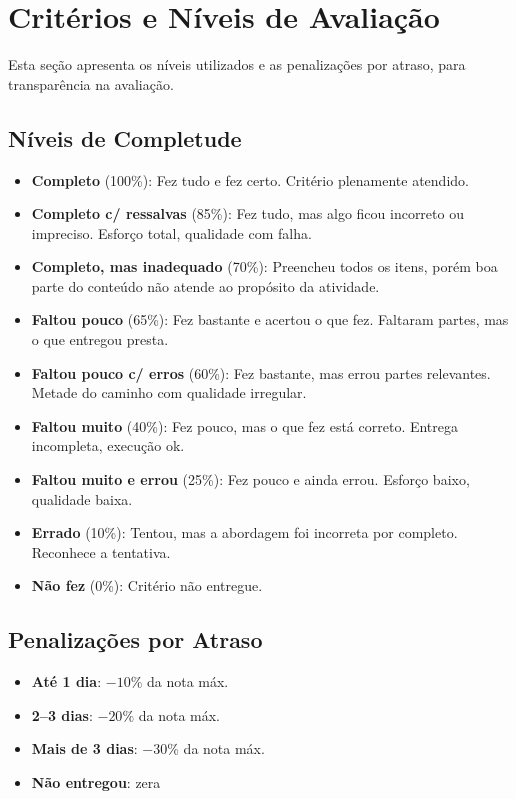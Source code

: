\documentclass[
  sigconf,
  language=portuguese
]{acmart}
\begin{document}
\section{Critérios e Níveis de Avaliação}

Esta seção apresenta os níveis utilizados e as penalizações por atraso, para transparência na avaliação.

\subsection{Níveis de Completude}

\begin{itemize}[leftmargin=14pt,itemsep=2pt,topsep=3pt]
  \item \textbf{Completo} (100\%): Fez tudo e fez certo. Critério plenamente atendido.
  \item \textbf{Completo c/ ressalvas} (85\%): Fez tudo, mas algo ficou incorreto ou impreciso. Esforço total, qualidade com falha.
  \item \textbf{Completo, mas inadequado} (70\%): Preencheu todos os itens, porém boa parte do conteúdo não atende ao propósito da atividade.
  \item \textbf{Faltou pouco} (65\%): Fez bastante e acertou o que fez. Faltaram partes, mas o que entregou presta.
  \item \textbf{Faltou pouco c/ erros} (60\%): Fez bastante, mas errou partes relevantes. Metade do caminho com qualidade irregular.
  \item \textbf{Faltou muito} (40\%): Fez pouco, mas o que fez está correto. Entrega incompleta, execução ok.
  \item \textbf{Faltou muito e errou} (25\%): Fez pouco e ainda errou. Esforço baixo, qualidade baixa.
  \item \textbf{Errado} (10\%): Tentou, mas a abordagem foi incorreta por completo. Reconhece a tentativa.
  \item \textbf{Não fez} (0\%): Critério não entregue.
\end{itemize}

\subsection{Penalizações por Atraso}

\begin{itemize}[leftmargin=14pt,itemsep=2pt,topsep=3pt]
  \item \textbf{Até 1 dia}: \(-10\%\) da nota máx.
  \item \textbf{2–3 dias}: \(-20\%\) da nota máx.
  \item \textbf{Mais de 3 dias}: \(-30\%\) da nota máx.
  \item \textbf{Não entregou}: zera
\end{itemize}
\end{document}
